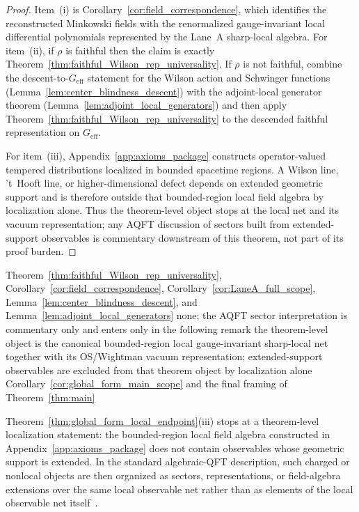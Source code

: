 \begin{proof}
Item~(i) is Corollary~\ref{cor:field_correspondence}, which identifies the reconstructed Minkowski fields with the renormalized gauge-invariant local differential polynomials represented by the Lane~A sharp-local algebra. For item~(ii), if $\rho$ is faithful then the claim is exactly Theorem~\ref{thm:faithful_Wilson_rep_universality}. If $\rho$ is not faithful, combine the descent-to-$G_{\mathrm{eff}}$ statement for the Wilson action and Schwinger functions (Lemma~\ref{lem:center_blindness_descent}) with the adjoint-local generator theorem (Lemma~\ref{lem:adjoint_local_generators}) and then apply Theorem~\ref{thm:faithful_Wilson_rep_universality} to the descended faithful representation on $G_{\mathrm{eff}}$.

For item~(iii), Appendix~\ref{app:axioms_package} constructs operator-valued tempered distributions localized in bounded spacetime regions. A Wilson line, 't~Hooft line, or higher-dimensional defect depends on extended geometric support and is therefore outside that bounded-region local field algebra by localization alone. Thus the theorem-level object stops at the local net and its vacuum representation; any AQFT discussion of sectors built from extended-support observables is commentary downstream of this theorem, not part of its proof burden.
\end{proof}

\dependencyledger
  {Theorem~\ref{thm:faithful_Wilson_rep_universality}, Corollary~\ref{cor:field_correspondence}, Corollary~\ref{cor:LaneA_full_scope}, Lemma~\ref{lem:center_blindness_descent}, and Lemma~\ref{lem:adjoint_local_generators}}
  {none; the AQFT sector interpretation is commentary only and enters only in the following remark}
  {the theorem-level object is the canonical bounded-region local gauge-invariant sharp-local net together with its OS/Wightman vacuum representation; extended-support observables are excluded from that theorem object by localization alone}
  {Corollary~\ref{cor:global_form_main_scope} and the final framing of Theorem~\ref{thm:main}}

\begin{remark}
Theorem~\ref{thm:global_form_local_endpoint}(iii) stops at a theorem-level localization statement: the bounded-region local field algebra constructed in Appendix~\ref{app:axioms_package} does not contain observables whose geometric support is extended.
In the standard algebraic-QFT description, such charged or nonlocal objects are then organized as sectors, representations, or field-algebra extensions over the same local observable net rather than as elements of the local observable net itself~\cite{DHR1,DHR2,DoplicherRoberts1990}.
\end{remark}

